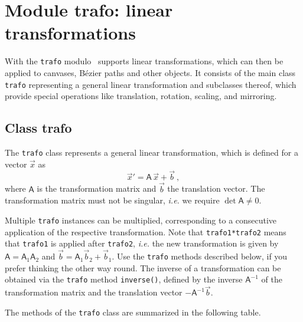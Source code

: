 \chapter{Module trafo: linear transformations}

\label{trafo}

With the  \verb|trafo| modulo \PyX\ supports linear transformations, which can 
then be applied to canvases,  B\'ezier paths and other objects. It consists
of the main class \verb|trafo| representing a general linear
transformation and subclasses thereof, which provide special operations
like translation, rotation, scaling, and mirroring.

\section{Class trafo}

The \verb|trafo| class represents a general linear
transformation, which is defined for a vector $\vec{x}$ as
\[
  \vec{x}' = \mathsf{A}\, \vec{x} + \vec{b}\ ,
\]
where $\mathsf{A}$ is the transformation matrix and $\vec{b}$ the
translation vector. The transformation matrix must not be singular,
\textit{i.e.} we require $\det \mathsf{A} \ne 0$.



Multiple \verb|trafo| instances can be multiplied, corresponding to a
consecutive application of the respective transformation. Note that
\verb|trafo1*trafo2| means that \verb|trafo1| is applied after
\verb|trafo2|, \textit{i.e.} the new transformation is given 
by $\mathsf{A} = \mathsf{A}_1 \mathsf{A}_2$ and
$\vec{b} = \mathsf{A}_1 \vec{b}_2 + \vec{b}_1$.  Use the \verb|trafo|
methods described below, if you prefer thinking the other way round.
The inverse of a transformation can be obtained via the \verb|trafo|
method \verb|inverse()|, defined by the inverse $\mathsf{A}^{-1}$ of
the transformation matrix and the translation vector
$-\mathsf{A}^{-1}\vec{b}$.

The methods of the \verb|trafo| class are summarized in the following
table.

